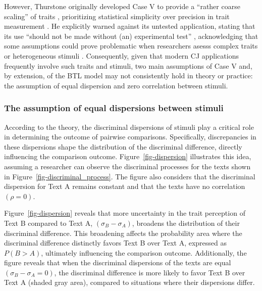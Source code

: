 \documentclass[
  authoryear,
  preprint,
  1p]{elsarticle}
\begin{document}
However, Thurstone originally developed Case V to provide a ``rather
coarse scaling'' of traits \citep[pp.~269]{Thurstone_1927b},
prioritizing statistical simplicity over precision in trait measurement
\citep[pp.~677]{Kelly_et_al_2022}. He explicitly warned against its
untested application, stating that its use ``should not be made without
(an) experimental test'' \citep[pp.~270]{Thurstone_1927b}, acknowledging
that some assumptions could prove problematic when researchers asesss
complex traits or heterogeneous stimuli
\citep[pp.~376]{Thurstone_1927a}. Consequently, given that modern CJ
applications frequently involve such traits and stimuli, two main
assumptions of Case V and, by extension, of the BTL model may not
consistently hold in theory or practice: the assumption of equal
dispersion and zero correlation between stimuli.

\subsubsection{The assumption of equal dispersions between
stimuli}\label{sec-theory-issue1a}

According to the theory, the discriminal dispersions of stimuli play a
critical role in determining the outcome of pairwise comparisons.
Specifically, discrepancies in these dispersions shape the distribution
of the discriminal difference, directly influencing the comparison
outcome. Figure~\ref{fig-dispersion} illustrates this idea, assuming a
researcher can observe the discriminal processes for the texts shown in
Figure~\ref{fig-discriminal_process}. The figure also considers that the
discriminal dispersion for Text A remains constant and that the texts
have no correlation \((\rho=0)\).

Figure~\ref{fig-dispersion} reveals that more uncertainty in the trait
perception of Text B compared to Text A, \((\sigma_{B}-\sigma_{A})\),
broadens the distribution of their discriminal difference. This
broadening affects the probability area where the discriminal difference
distinctly favors Text B over Text A, expressed as \(P(B > A)\),
ultimately influencing the comparison outcome. Additionally, the figure
reveals that when the discriminal dispersions of the texts are equal
\((\sigma_{B}-\sigma_{A}=0)\), the discriminal difference is more likely
to favor Text B over Text A (shaded gray area), compared to situations
where their dispersions differ.
\end{document}
